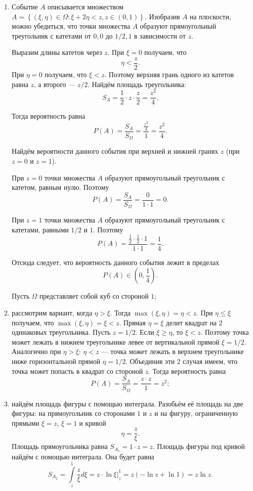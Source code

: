 \begin{enumerate}[label=\alph*)]
\item Событие $A$ описывается множеством
$A =
\left\{ \left( \xi, \eta \right) \in \Omega:
\xi + 2 \eta < z, z \in \left( 0, 1 \right) \right\}$.
Изобразив $A$ на плоскости, можно убедиться,
что точки множества $A$ образуют прямоугольный треугольник с катетами от $0, 0$ до $1/2, 1$ в зависимости от $z$.

Выразим длины катетов через $z$.
При $ \xi = 0$ получаем, что
$$ \eta < \frac{z}{2}.$$
При $ \eta = 0$ получаем, что $ \xi < z$.
Поэтому верхняя грань одного из катетов равна $z$, а второго --- $z/2$.
Найдём площадь треугольника:
$$S_A =
\frac{1}{2} \cdot z \cdot \frac{z}{2} =
\frac{z^2}{4}.$$

Тогда вероятность равна
$$P \left( A \right) =
\frac{S_A}{S_{ \Omega }} =
\frac{ \frac{z^2}{4} }{1} =
\frac{z^2}{4}.$$

Найдём вероятности данного события при верхней и нижней гранях $z$ (при $z=0$ и $z=1$).

При $z=0$ точки множества $A$ образуют прямоугольный треугольник с катетом, равным нулю.
Поэтому
$$P \left( A \right) =
\frac{S_A}{S_{ \Omega }} =
\frac{0}{1 \cdot 1} =
0.$$

При $z=1$ точки множества $A$ образуют прямоугольный треугольник с катетами, равными $1/2$ и $1$.
Поэтому
$$P \left( A \right) =
\frac{ \frac{1}{2} \cdot \frac{1}{2} \cdot 1}{1 \cdot 1} =
\frac{1}{4}.$$

Отсюда следует, что вероятность данного события лежит в пределах
$$P \left( A \right) \in \left( 0, \frac{1}{4} \right).$$

Пусть $ \Omega $ представляет собой куб со стороной $1$;

\item рассмотрим вариант, когда $ \eta > \xi $.
Тогда $ \max \left( \xi, \eta \right) = \eta < z$.
При $ \eta \leq \xi $ получаем, что $ \max \left( \xi, \eta \right) = \xi < z$.
Прямая $ \eta = \xi $ делит квадрат на 2 одинаковых треугольника.
Пусть $z = 1/2$.
Если $ \xi \geq \eta $, то $ \xi < z$.
Поэтому точка может лежать в нижнем треугольнике левее от вертикальной прямой $ \xi = 1/2$.
Аналогично при $ \eta > \xi : \, \eta < z$ --- точка может лежать в верхнем треугольнике ниже горизонтальной прямой $ \eta = 1/2$.
Объединив эти 2 случая имеем, что точка может попасть в квадрат со стороной $z$.
Тогда вероятность равна
$$P \left( A \right) =
\frac{S_A}{S_{ \Omega }} =
\frac{z \cdot z}{1} =
z^2;$$

\item найдём площадь фигуры с помощью интеграла.
Разобьём её площадь на две фигуры: на прямоугольник со сторонами $1$ и $z$ и на фигуру, ограниченную прямыми $ \xi = z, \, \xi = 1$ и кривой
$$ \eta =
\frac{z}{ \xi }.$$
Площадь прямоугольника равна $S_{A_1} = 1 \cdot z = z$.
Площадь фигуры под кривой найдём с помощью интеграла.
Она будет равна
$$S_{A_2} =
\int \limits_{z}^1 \frac{z}{ \xi } d \xi =
\left. z \cdot \ln \xi \right|_z^1 =
z \left( - \ln z + \ln 1 \right) =
z \ln z.$$


\end{enumerate}

